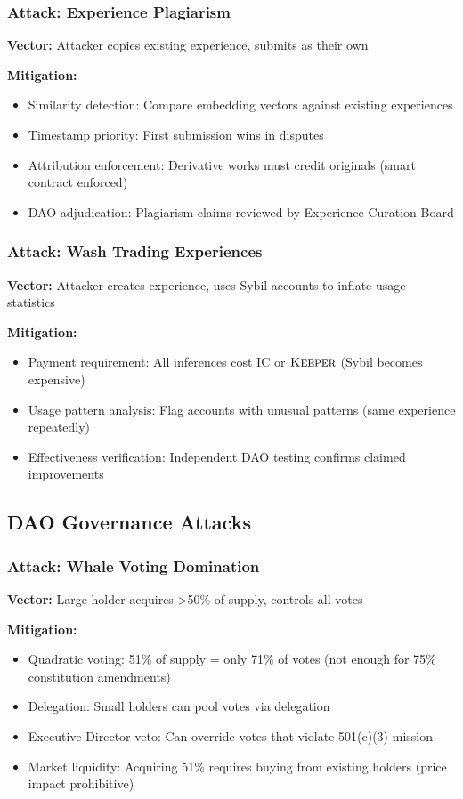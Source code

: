 \documentclass[11pt,letterpaper]{article}
\theoremstyle{definition}
\theoremstyle{remark}
\newcommand{\KEEPER}{\textsc{Keeper}}
\begin{document}
\subsubsection{Attack: Experience Plagiarism}

\textbf{Vector:} Attacker copies existing experience, submits as their own

\textbf{Mitigation:}
\begin{itemize}
\item Similarity detection: Compare embedding vectors against existing experiences
\item Timestamp priority: First submission wins in disputes
\item Attribution enforcement: Derivative works must credit originals (smart contract enforced)
\item DAO adjudication: Plagiarism claims reviewed by Experience Curation Board
\end{itemize}

\subsubsection{Attack: Wash Trading Experiences}

\textbf{Vector:} Attacker creates experience, uses Sybil accounts to inflate usage statistics

\textbf{Mitigation:}
\begin{itemize}
\item Payment requirement: All inferences cost IC or $\KEEPER$ (Sybil becomes expensive)
\item Usage pattern analysis: Flag accounts with unusual patterns (same experience repeatedly)
\item Effectiveness verification: Independent DAO testing confirms claimed improvements
\end{itemize}

\subsection{DAO Governance Attacks}

\subsubsection{Attack: Whale Voting Domination}

\textbf{Vector:} Large holder acquires >50\% of supply, controls all votes

\textbf{Mitigation:}
\begin{itemize}
\item Quadratic voting: 51\% of supply = only 71\% of votes (not enough for 75\% constitution amendments)
\item Delegation: Small holders can pool votes via delegation
\item Executive Director veto: Can override votes that violate 501(c)(3) mission
\item Market liquidity: Acquiring 51\% requires buying from existing holders (price impact prohibitive)
\end{itemize}
\end{document}
